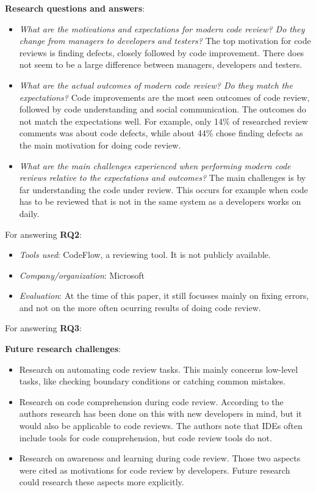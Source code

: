 \documentclass[]{book}
\providecommand{\tightlist}{%
  \setlength{\itemsep}{0pt}\setlength{\parskip}{0pt}}
\begin{document}
\textbf{Research questions and answers}:

\begin{itemize}
\tightlist
\item
  \emph{What are the motivations and expectations for modern code
  review? Do they change from managers to developers and testers?} The
  top motivation for code reviews is finding defects, closely followed
  by code improvement. There does not seem to be a large difference
  between managers, developers and testers.
\item
  \emph{What are the actual outcomes of modern code review? Do they
  match the expectations?} Code improvements are the most seen outcomes
  of code review, followed by code understanding and social
  communication. The outcomes do not match the expectations well. For
  example, only 14\% of researched review comments was about code
  defects, while about 44\% chose finding defects as the main motivation
  for doing code review.
\item
  \emph{What are the main challenges experienced when performing modern
  code reviews relative to the expectations and outcomes?} The main
  challenges is by far understanding the code under review. This occurs
  for example when code has to be reviewed that is not in the same
  system as a developers works on daily.
\end{itemize}

For answering \textbf{RQ2}:

\begin{itemize}
\tightlist
\item
  \emph{Tools used}: CodeFlow, a reviewing tool. It is not publicly
  available.
\item
  \emph{Company/organization}: Microsoft
\item
  \emph{Evaluation}: At the time of this paper, it still focusses mainly
  on fixing errors, and not on the more often ocurring results of doing
  code review.
\end{itemize}

For answering \textbf{RQ3}:

\textbf{Future research challenges}:

\begin{itemize}
\tightlist
\item
  Research on automating code review tasks. This mainly concerns
  low-level tasks, like checking boundary conditions or catching common
  mistakes.
\item
  Research on code comprehension during code review. According to the
  authors research has been done on this with new developers in mind,
  but it would also be applicable to code reviews. The authors note that
  IDEs often include tools for code comprehension, but code review tools
  do not.
\item
  Research on awareness and learning during code review. Those two
  aspects were cited as motivations for code review by developers.
  Future research could research these aspects more explicitly.
\end{itemize}
\end{document}
